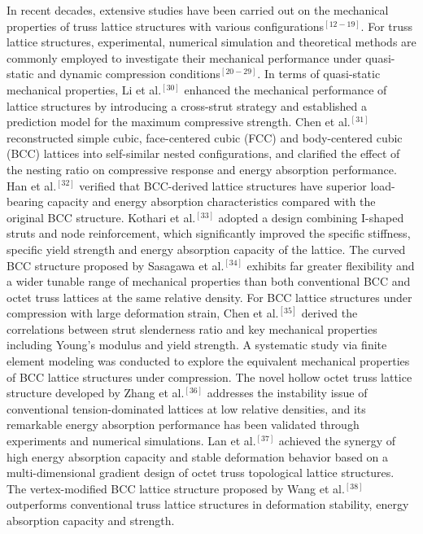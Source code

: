 \documentclass{article} %
\begin{document}
In recent decades, extensive studies have been carried out on the mechanical properties of truss lattice structures with various configurations${}^{[12-19]}$. For truss lattice structures, experimental, numerical simulation and theoretical methods are commonly employed to investigate their mechanical performance under quasi-static and dynamic compression conditions${}^{[20-29]}$. In terms of quasi-static mechanical properties, Li et al.${}^{[30]}$ enhanced the mechanical performance of lattice structures by introducing a cross-strut strategy and established a prediction model for the maximum compressive strength. Chen et al.${}^{[31]}$ reconstructed simple cubic, face-centered cubic (FCC) and body-centered cubic (BCC) lattices into self-similar nested configurations, and clarified the effect of the nesting ratio on compressive response and energy absorption performance. Han et al.${}^{[32]}$ verified that BCC-derived lattice structures have superior load-bearing capacity and energy absorption characteristics compared with the original BCC structure. Kothari et al.${}^{[33]}$ adopted a design combining I-shaped struts and node reinforcement, which significantly improved the specific stiffness, specific yield strength and energy absorption capacity of the lattice. The curved BCC structure proposed by Sasagawa et al.${}^{[34]}$ exhibits far greater flexibility and a wider tunable range of mechanical properties than both conventional BCC and octet truss lattices at the same relative density. For BCC lattice structures under compression with large deformation strain, Chen et al.${}^{[35]}$ derived the correlations between strut slenderness ratio and key mechanical properties including Young's modulus and yield strength. A systematic study via finite element modeling was conducted to explore the equivalent mechanical properties of BCC lattice structures under compression. The novel hollow octet truss lattice structure developed by Zhang et al.${}^{[36]}$ addresses the instability issue of conventional tension-dominated lattices at low relative densities, and its remarkable energy absorption performance has been validated through experiments and numerical simulations. Lan et al.${}^{[37]}$ achieved the synergy of high energy absorption capacity and stable deformation behavior based on a multi-dimensional gradient design of octet truss topological lattice structures. The vertex-modified BCC lattice structure proposed by Wang et al.${}^{[38]}$ outperforms conventional truss lattice structures in deformation stability, energy absorption capacity and strength.
\end{document}

